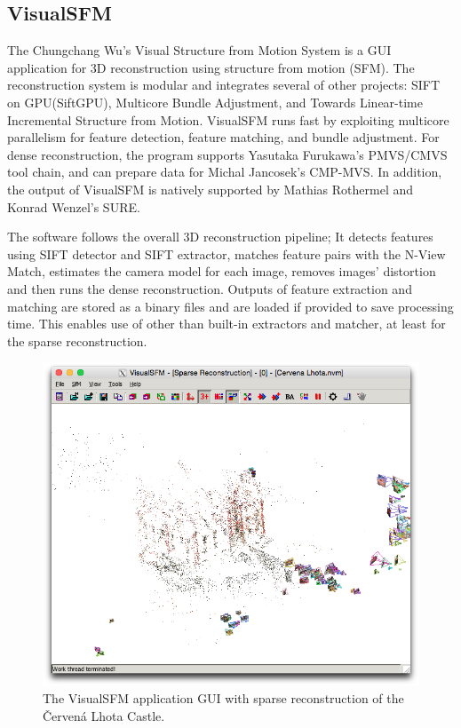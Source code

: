 \subsection*{VisualSFM}
The Chungchang Wu's Visual Structure from Motion System is a GUI application for 3D reconstruction using structure from motion (SFM). The reconstruction system is modular and integrates several of other projects: SIFT on GPU(SiftGPU), Multicore Bundle Adjustment, and Towards Linear-time Incremental Structure from Motion. VisualSFM runs fast by exploiting multicore parallelism for feature detection, feature matching, and bundle adjustment. For dense reconstruction, the program supports Yasutaka Furukawa's PMVS/CMVS tool chain, and can prepare data for Michal Jancosek's CMP-MVS. In addition, the output of VisualSFM is natively supported by Mathias Rothermel and Konrad Wenzel's SURE.

The software follows the overall 3D reconstruction pipeline; It detects features using SIFT detector and SIFT extractor, matches feature pairs with the N-View Match, estimates the camera model for each image, removes images' distortion and then runs the dense reconstruction. Outputs of feature extraction and matching are stored as a binary files and are loaded if provided to save processing time. This enables use of other than built-in extractors and matcher, at least for the sparse reconstruction. \cite{www:visual_sfm}

\begin{figure}[ht]
	\begin{center}
		\includegraphics[keepaspectratio,width=\textwidth]{fig/VisualSFM.png}
	\end{center}
	\caption{The VisualSFM application GUI with sparse reconstruction of the Červená Lhota Castle.}
	\label{fig:visualsfm}
\end{figure}

